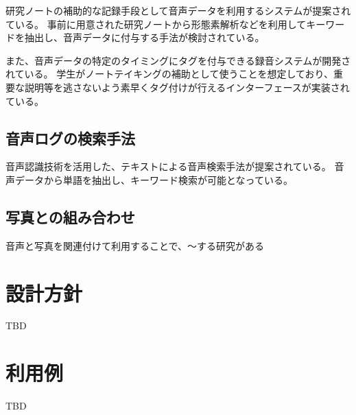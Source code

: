 研究ノートの補助的な記録手段として音声データを利用するシステムが提案されている\cite{Kawanishi}。
事前に用意された研究ノートから形態素解析などを利用してキーワードを抽出し、音声データに付与する手法が検討されている。

また、音声データの特定のタイミングにタグを付与できる録音システムが開発されている\cite{Fujisaka}。
学生がノートテイキングの補助として使うことを想定しており、重要な説明等を逃さないよう素早くタグ付けが行えるインターフェースが実装されている。

\subsection{音声ログの検索手法}

音声認識技術を活用した、テキストによる音声検索手法が提案されている\cite{Vemuri}。
音声データから単語を抽出し、キーワード検索が可能となっている。

\subsection{写真との組み合わせ}

音声と写真を関連付けて利用することで、〜する研究がある\cite{Nakakura}\cite{Masui}

\section{設計方針}

TBD

\section{利用例}

TBD
